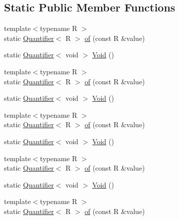 \subsection*{Static Public Member Functions}
\begin{DoxyCompactItemize}
\item 
{\footnotesize template$<$typename R $>$ }\\static \mbox{\hyperlink{structfakeit_1_1Quantifier}{Quantifier}}$<$ R $>$ \mbox{\hyperlink{structfakeit_1_1Times_a9c53fb71e7c6d2e295a77909bd971193}{of}} (const R \&value)
\item 
static \mbox{\hyperlink{structfakeit_1_1Quantifier}{Quantifier}}$<$ void $>$ \mbox{\hyperlink{structfakeit_1_1Times_ab473a1b456a5d360aff2fc5c4749ecae}{Void}} ()
\item 
{\footnotesize template$<$typename R $>$ }\\static \mbox{\hyperlink{structfakeit_1_1Quantifier}{Quantifier}}$<$ R $>$ \mbox{\hyperlink{structfakeit_1_1Times_a9c53fb71e7c6d2e295a77909bd971193}{of}} (const R \&value)
\item 
static \mbox{\hyperlink{structfakeit_1_1Quantifier}{Quantifier}}$<$ void $>$ \mbox{\hyperlink{structfakeit_1_1Times_ab473a1b456a5d360aff2fc5c4749ecae}{Void}} ()
\item 
{\footnotesize template$<$typename R $>$ }\\static \mbox{\hyperlink{structfakeit_1_1Quantifier}{Quantifier}}$<$ R $>$ \mbox{\hyperlink{structfakeit_1_1Times_a9c53fb71e7c6d2e295a77909bd971193}{of}} (const R \&value)
\item 
static \mbox{\hyperlink{structfakeit_1_1Quantifier}{Quantifier}}$<$ void $>$ \mbox{\hyperlink{structfakeit_1_1Times_ab473a1b456a5d360aff2fc5c4749ecae}{Void}} ()
\item 
{\footnotesize template$<$typename R $>$ }\\static \mbox{\hyperlink{structfakeit_1_1Quantifier}{Quantifier}}$<$ R $>$ \mbox{\hyperlink{structfakeit_1_1Times_a9c53fb71e7c6d2e295a77909bd971193}{of}} (const R \&value)
\item 
static \mbox{\hyperlink{structfakeit_1_1Quantifier}{Quantifier}}$<$ void $>$ \mbox{\hyperlink{structfakeit_1_1Times_ab473a1b456a5d360aff2fc5c4749ecae}{Void}} ()
\item 
{\footnotesize template$<$typename R $>$ }\\static \mbox{\hyperlink{structfakeit_1_1Quantifier}{Quantifier}}$<$ R $>$ \mbox{\hyperlink{structfakeit_1_1Times_a9c53fb71e7c6d2e295a77909bd971193}{of}} (const R \&value)

\end{DoxyCompactItemize}
